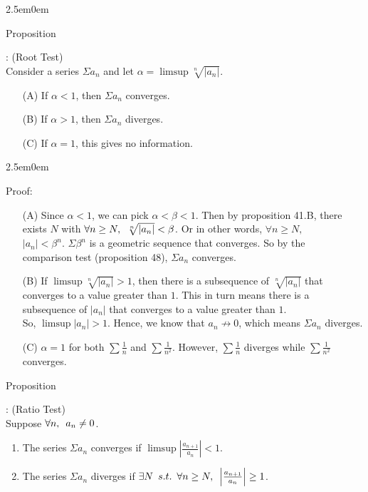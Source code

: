 \documentclass{book}
\newcommand{\hTwo}{%
   \color{MidnightBlue}%
   \fontsize{13}{15}\selectfont%
}
\newcommand{\hThree}{%
   \color{PineGreen}
   \fontsize{13}{15}\selectfont%
}
\newenvironment{myIndent}{%
   \begin{adjustwidth}{2.5em}{0em}%
}{%
   \end{adjustwidth}%
}
\newcommand{\retTwo}{\hfill\bigbreak}
\newcommand{\suchthat}{ \hspace{0.5em}s.t.\hspace{0.5em}}
\newcommand{\myHS}{ \hspace{0.5em}}
\newcounter{PropNumber}
\newcommand{\propCount}[1][1]{%
   \addtocounter{PropNumber}{#1}%
   \thePropNumber%
}
\begin{document}
      {\begin{myIndent} \hTwo
         Proposition \propCount: (Root Test)\\
         Consider a series $\Sigma a_n$ and let $\alpha = \limsup{\sqrt[n]{|a_n|}}$.
         \begin{enumerate}
            \item[(A)] If $\alpha < 1$, then $\Sigma a_n$ converges.
            \item[(B)] If $\alpha > 1$, then $\Sigma a_n$ diverges.
            \item[(C)] If $\alpha = 1$, this gives no information.
         \end{enumerate}
         \retTwo
         
         {\begin{myIndent} \hThree
            Proof:
            \begin{enumerate}
               \item[(A)] Since $\alpha < 1$, we can pick $\alpha < \beta < 1$. Then by proposition 41.B, there exists $N$ with $\forall n \geq N, \myHS \sqrt[n]{|a_n|} < \beta$. Or in other words, $\forall n \geq N,$\\ $|a_n| < \beta^n$. $\Sigma \beta^n$ is a geometric sequence that converges. So by the\\ comparison test (proposition 48), $\Sigma a_n$ converges.
               \newpage
               \item[(B)] If $\limsup{\sqrt[n]{|a_n|}} > 1$, then there is a subsequence of $\sqrt[n]{|a_n|}$ that\\ converges to a value greater than $1$. This in turn means there is a\\ subsequence of $|a_n|$ that converges to a value greater than $1$.\\ So, $\limsup{|a_n|} > 1$. Hence, we know that $a_n \not\rightarrow 0$, which means $\Sigma a_n$ diverges.
               \\
               \item[(C)] $\alpha = 1$ for both $\sum\frac{1}{n}$ and $\sum\frac{1}{n^2}$. However, $\sum\frac{1}{n}$ diverges while $\sum\frac{1}{n^2}$\\ converges.
            \end{enumerate}
         \end{myIndent}}
         \retTwo

         Proposition \propCount: (Ratio Test)\\
         Suppose $\forall n, \myHS a_n \neq 0$.
         \begin{enumerate}
            \item The series $\Sigma a_n$ converges if $\limsup{\left|\frac{a_{n+1}}{a_n}\right|} < 1$.
            \item The series $\Sigma a_n$ diverges if $\exists N \suchthat \forall n \geq N, \myHS \left|\frac{a_{n+1}}{a_n}\right| \geq 1$.
         \end{enumerate}
         \retTwo


\end{myIndent}}
\end{document}

